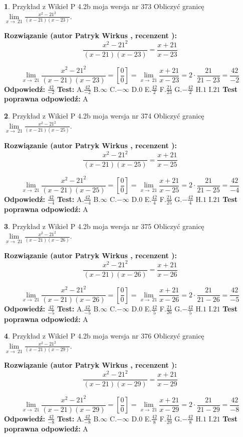 \documentclass[12pt, a4paper]{article}
\theoremstyle{definition} %
\newtheorem{zad}{}
\newcommand{\zadStart}[1]{\begin{zad}#1\newline}
\newcommand{\zadStop}{\end{zad}}
\newcommand{\rozwStart}[2]{\noindent \textbf{Rozwiązanie (autor #1 , recenzent #2): }\newline}
\newcommand{\rozwStop}{\newline}
\newcommand{\odpStart}{\noindent \textbf{Odpowiedź:}\newline}
\newcommand{\odpStop}{\newline}
\newcommand{\testStart}{\noindent \textbf{Test:}\newline}
\newcommand{\testStop}{\newline}
\newcommand{\kluczStart}{\noindent \textbf{Test poprawna odpowiedź:}\newline}
\newcommand{\kluczStop}{\newline}
\begin{document}
\zadStart{Przykład z Wikieł P 4.2b moja wersja nr 373}
Obliczyć granicę $\lim\limits_{x\to\ 21}\frac{x^{2}-21^{2}}{(x-21)(x-23)}$.
\zadStop
\rozwStart{Patryk Wirkus}{}
$$\frac{x^{2}-21^{2}}{(x-21)(x-23)}=\frac{x+21}{x-23}$$

$$\lim\limits_{x\to\ 21}\frac{x^{2}-21^{2}}{(x-21)(x-23)}=[\frac{0}{0}]=\lim\limits_{x\to\ 21}\frac{x+21}{x-23}=2 \cdot \frac{21}{21-23} = \frac{42}{-2}$$
\rozwStop
\odpStart
$\frac{42}{-2}$
\odpStop
\testStart
A.$\frac{42}{-2}$
B.$\infty$
C.$-\infty$
D.$0$
E.$\frac{42}{2}$
F.$\frac{21}{23}$
G.$-\frac{42}{2}$
H.$1$
I.$21$
\testStop
\kluczStart
A
\kluczStop



\zadStart{Przykład z Wikieł P 4.2b moja wersja nr 374}
Obliczyć granicę $\lim\limits_{x\to\ 21}\frac{x^{2}-21^{2}}{(x-21)(x-25)}$.
\zadStop
\rozwStart{Patryk Wirkus}{}
$$\frac{x^{2}-21^{2}}{(x-21)(x-25)}=\frac{x+21}{x-25}$$

$$\lim\limits_{x\to\ 21}\frac{x^{2}-21^{2}}{(x-21)(x-25)}=[\frac{0}{0}]=\lim\limits_{x\to\ 21}\frac{x+21}{x-25}=2 \cdot \frac{21}{21-25} = \frac{42}{-4}$$
\rozwStop
\odpStart
$\frac{42}{-4}$
\odpStop
\testStart
A.$\frac{42}{-4}$
B.$\infty$
C.$-\infty$
D.$0$
E.$\frac{42}{4}$
F.$\frac{21}{25}$
G.$-\frac{42}{4}$
H.$1$
I.$21$
\testStop
\kluczStart
A
\kluczStop



\zadStart{Przykład z Wikieł P 4.2b moja wersja nr 375}
Obliczyć granicę $\lim\limits_{x\to\ 21}\frac{x^{2}-21^{2}}{(x-21)(x-26)}$.
\zadStop
\rozwStart{Patryk Wirkus}{}
$$\frac{x^{2}-21^{2}}{(x-21)(x-26)}=\frac{x+21}{x-26}$$

$$\lim\limits_{x\to\ 21}\frac{x^{2}-21^{2}}{(x-21)(x-26)}=[\frac{0}{0}]=\lim\limits_{x\to\ 21}\frac{x+21}{x-26}=2 \cdot \frac{21}{21-26} = \frac{42}{-5}$$
\rozwStop
\odpStart
$\frac{42}{-5}$
\odpStop
\testStart
A.$\frac{42}{-5}$
B.$\infty$
C.$-\infty$
D.$0$
E.$\frac{42}{5}$
F.$\frac{21}{26}$
G.$-\frac{42}{5}$
H.$1$
I.$21$
\testStop
\kluczStart
A
\kluczStop



\zadStart{Przykład z Wikieł P 4.2b moja wersja nr 376}
Obliczyć granicę $\lim\limits_{x\to\ 21}\frac{x^{2}-21^{2}}{(x-21)(x-29)}$.
\zadStop
\rozwStart{Patryk Wirkus}{}
$$\frac{x^{2}-21^{2}}{(x-21)(x-29)}=\frac{x+21}{x-29}$$

$$\lim\limits_{x\to\ 21}\frac{x^{2}-21^{2}}{(x-21)(x-29)}=[\frac{0}{0}]=\lim\limits_{x\to\ 21}\frac{x+21}{x-29}=2 \cdot \frac{21}{21-29} = \frac{42}{-8}$$
\rozwStop
\odpStart
$\frac{42}{-8}$
\odpStop
\testStart
A.$\frac{42}{-8}$
B.$\infty$
C.$-\infty$
D.$0$
E.$\frac{42}{8}$
F.$\frac{21}{29}$
G.$-\frac{42}{8}$
H.$1$
I.$21$
\testStop
\kluczStart
A
\kluczStop
\end{document}
